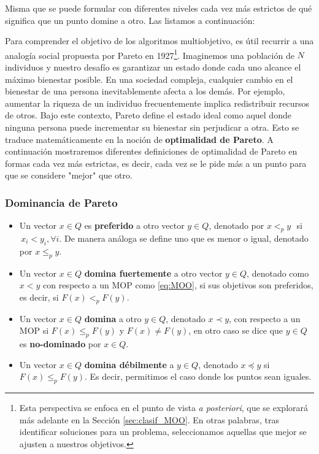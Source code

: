 Misma que se puede formular con diferentes niveles cada vez más estrictos de qué significa que un punto domine a otro. Las listamos a continuación:

Para comprender el objetivo de los algoritmos multiobjetivo, es útil recurrir a una analogía social propuesta por Pareto en 1927\footnote{Esta perspectiva se enfoca en el punto de vista \emph{a posteriori}, que se explorará más adelante en la Sección \ref{sec:clasif_MOO}. En otras palabras, tras identificar soluciones para un problema, seleccionamos aquellas que mejor se ajusten a nuestros objetivos.}. Imaginemos una población de $N$ individuos y nuestro desafío es garantizar un estado donde cada uno alcance el máximo bienestar posible. En una sociedad compleja, cualquier cambio en el bienestar de una persona inevitablemente afecta a los demás. Por ejemplo, aumentar la riqueza de un individuo frecuentemente implica redistribuir recursos de otros. Bajo este contexto, Pareto define el estado ideal como aquel donde ninguna persona puede incrementar su bienestar sin perjudicar a otra. Esto se traduce matemáticamente en la noción de \textbf{optimalidad de Pareto}. A continuación mostraremos diferentes definiciones de optimalidad de Pareto en formas cada vez más estrictas, es decir, cada vez se le pide más a un punto para que se considere "mejor" que otro. 


\subsubsection*{Dominancia de Pareto}

\begin{itemize}
    \item Un vector $x\in Q$ es \textbf{preferido} a otro vector $y\in Q$, denotado por $x<_p y \, \, $ si $\, x_i <y_i, \forall i$. De manera análoga se define uno que es menor o igual, denotado por $x\leq_p y$.
    \item Un vector $x\in Q$ \textbf{domina fuertemente} a otro vector $y\in Q$, denotado como $x < y$ con respecto a un MOP como \eqref{eq:MOO}, si sus objetivos son preferidos, es decir, si $F(x) <_p F(y)$.
    \item Un vector $x\in Q$ \textbf{domina} a otro $y\in Q$, denotado $x\prec y$, con respecto a un MOP si $F(x) \leq_p F(y)$ y $F(x)\neq F(y)$, en otro caso se dice que $y\in Q$  es \textbf{no-dominado} por $x\in Q$.
    \item Un vector $x\in Q$ \textbf{domina débilmente} a $y\in Q$, denotado $x\preceq y$ si $F(x)\leq_p F(y)$. Es decir, permitimos el caso donde los puntos sean iguales. 
\end{itemize}

